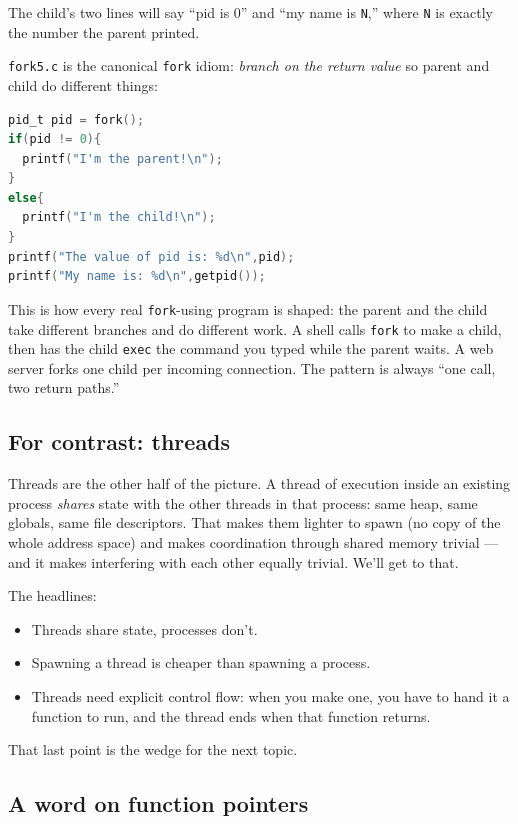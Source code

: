 \documentclass[11pt]{article}
\begin{document}
The child's two lines will say ``pid is 0'' and ``my name is
\texttt{N},'' where \texttt{N} is exactly the number the parent
printed.

\texttt{fork5.c} is the canonical \texttt{fork} idiom: \emph{branch on
the return value} so parent and child do different things:

\begin{lstlisting}[language=C]
pid_t pid = fork();
if(pid != 0){
  printf("I'm the parent!\n");
}
else{
  printf("I'm the child!\n");
}
printf("The value of pid is: %d\n",pid);
printf("My name is: %d\n",getpid());
\end{lstlisting}

This is how every real \texttt{fork}-using program is shaped: the
parent and the child take different branches and do different work.
A shell calls \texttt{fork} to make a child, then has the child
\texttt{exec} the command you typed while the parent waits. A web
server forks one child per incoming connection. The pattern is always
``one call, two return paths.''

\subsection*{For contrast: threads}

Threads are the other half of the picture. A thread of execution
inside an existing process \emph{shares} state with the other threads
in that process: same heap, same globals, same file descriptors. That
makes them lighter to spawn (no copy of the whole address space) and
makes coordination through shared memory trivial --- and it makes
interfering with each other equally trivial. We'll get to that.

The headlines:
\begin{itemize}
  \item Threads share state, processes don't.
  \item Spawning a thread is cheaper than spawning a process.
  \item Threads need explicit control flow: when you make one, you
    have to hand it a function to run, and the thread ends when that
    function returns.
\end{itemize}

That last point is the wedge for the next topic.

\subsection*{A word on function pointers}
\end{document}
